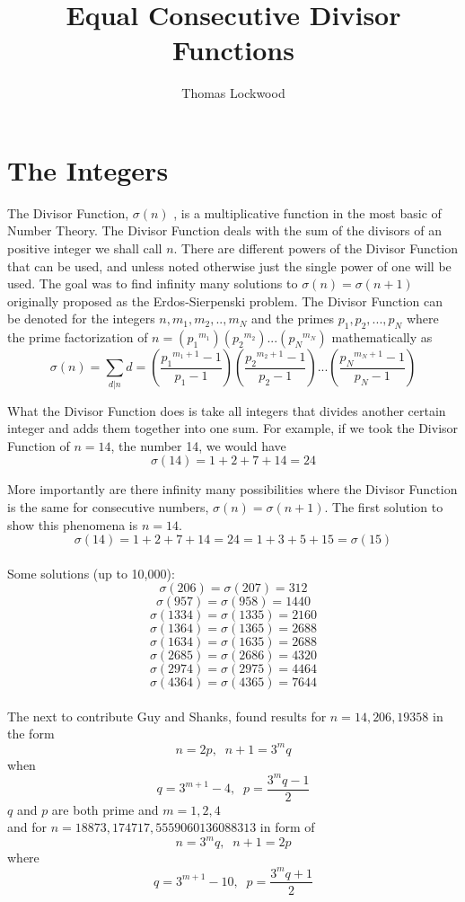 \documentclass[12pt]{amsart}
\title{Equal Consecutive Divisor Functions}
\author{Thomas Lockwood}
\begin{document}
\maketitle
\thispagestyle{empty}

\section{The Integers}
The Divisor Function, $\sigma{(n)}$ , is a multiplicative function in the most basic of Number Theory. The Divisor Function deals with the sum of the divisors of an positive integer we shall call $n$. There are different powers of the Divisor Function that can be used, and unless noted otherwise just the single power of one will be used. The goal was to find infinity many solutions to $\sigma{(n)}=\sigma{(n+1)}$ originally proposed as the Erdos-Sierpenski problem. The Divisor Function can be denoted  for the integers $n, m_1,m_2,..,m_N$ and the primes $p_1 ,p_2 ,..., p_N$ where the prime factorization of $n = ({p_1}^{m_1})({p_2}^{m_2})...({p_N}^{m_N})$ mathematically as $$\sigma(n) = \sum_{d|{n}}d = (\frac{{p_1}^{m_1+1} - 1} {{p_1} - 1}) (\frac{{p_2}^{m_2+1} - 1}{{p_2} - 1})... (\frac{{p_N}^{m_N+1} - 1}{{p_N} - 1}) $$ 

What the Divisor Function does is take all integers that divides another certain integer and adds them together into one sum. For example, if we took the Divisor Function of $n = 14$, the number 14, we would have $$\sigma(14) = 1 + 2 + 7 + 14 = 24$$

More importantly are there infinity many possibilities where the Divisor Function is the same for consecutive numbers, $\sigma(n) = \sigma(n+1)$. The first solution to show this phenomena is $n = 14$. 
\\
$$\sigma(14)= 1 + 2 + 7 + 14 = 24 = 1 + 3 + 5 + 15 = \sigma(15)$$ 
\\

Some solutions (up to 10,000):
\\
$$\sigma(206) = \sigma(207) = 312$$
$$\sigma(957) = \sigma(958) = 1440$$
$$\sigma(1334) = \sigma(1335) = 2160$$
$$\sigma(1364) = \sigma(1365) = 2688$$
$$\sigma(1634) = \sigma(1635) = 2688$$
$$\sigma(2685) = \sigma(2686) = 4320$$
$$\sigma(2974) = \sigma(2975) = 4464$$
$$\sigma(4364) = \sigma(4365) = 7644$$
\\
The next to contribute Guy and Shanks, found results for $n = 14, 206, 19358$ in the form $$n = 2p,\; \; n + 1 = 3^{m}q$$ when $$q = 3^{m+1} - 4, \; \; p=\frac{3^{m}q-1} {2}$$ $q$ and $p$ are both prime and $m = 1, 2, 4$
\\
and for $n = 18873, 174717, 5559060136088313$ in form of $$n = 3^{m}q, \; \; n+1 = 2p$$ where $$q = 3^{m+1} - 10, \; \; p = \frac{3^{m}q + 1} {2}$$
\\
\end{document}
